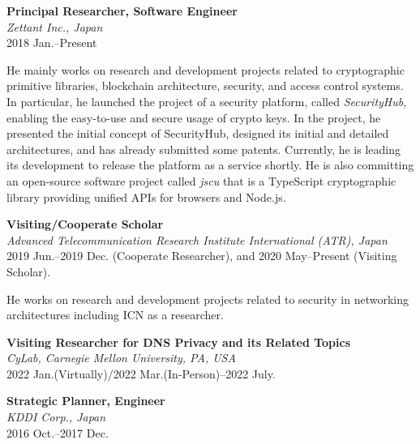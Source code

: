 \textbf{Principal Researcher, Software Engineer}\\
\hspace*{4ex}\textit{Zettant Inc., Japan}\\
\hspace*{4ex}2018 Jan.--Present

\hspace*{4ex} He mainly works on research and development projects related to cryptographic primitive libraries, blockchain architecture, security, and access control systems. In particular, he launched the project of a security platform, called \emph{SecurityHub}, enabling the easy-to-use and secure usage of crypto keys. In the project, he presented the initial concept of SecurityHub, designed its initial and detailed architectures, and has already submitted some patents. Currently, he is leading its development to release the platform as a service shortly.
He is also committing an open-source software project called \emph{jscu} that is a TypeScript cryptographic library providing unified APIs for browsers and Node.js.
\vspace*{2ex}

\textbf{Visiting/Cooperate Scholar}\\
\hspace*{4ex}\textit{Advanced Telecommunication Research Institute International (ATR), Japan}\\
\hspace*{4ex}2019 Jun.--2019 Dec. (Cooperate Researcher), and 2020 May--Present (Visiting Scholar).

\hspace*{4ex} He works on research and development projects related to security in networking architectures including ICN as a researcher.
\vspace*{2ex}

\textbf{Visiting Researcher for DNS Privacy and its Related Topics}\\
\hspace*{4ex}\textit{CyLab, Carnegie Mellon University, PA, USA}\\
\hspace*{4ex} 2022 Jan.(Virtually)/2022 Mar.(In-Person)--2022 July.
\vspace{1ex}


\textbf{Strategic Planner, Engineer}\\
\hspace*{4ex}\textit{KDDI Corp., Japan}\\
\hspace*{4ex}2016 Oct.--2017 Dec.

